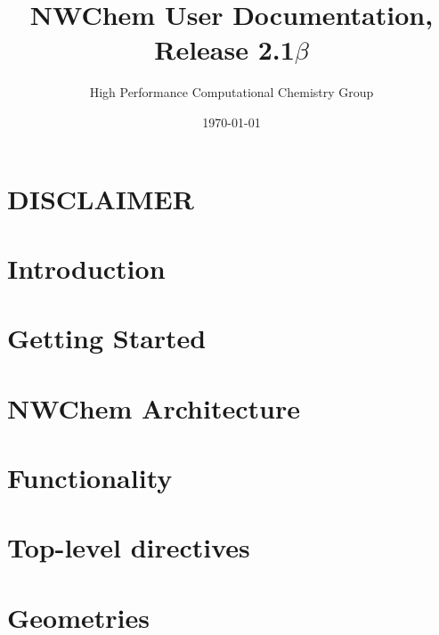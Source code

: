 
\setlength{\parskip}{6pt}

\newcommand{\nwchemversion}{2.1$\beta$}
\newcommand{\nwchemyear}{1997}

\newcommand{\angstroms}{Angstr{\o}ms}





\title{\bf\Large NWChem User Documentation, Release \nwchemversion}
\author{High Performance Computational Chemistry Group}
\date{\today}
\maketitle

\chapter*{\center DISCLAIMER}


\clearpage

\tableofcontents

\clearpage

\chapter{Introduction}


\chapter{Getting Started}


\chapter{NWChem Architecture}


\chapter{Functionality}


\chapter{Top-level directives}


\chapter{Geometries}


